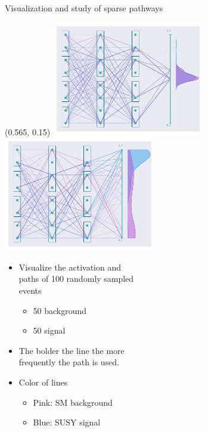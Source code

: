 \documentclass[UKenglish]{beamer}
\begin{document}
\begin{frame}{Visualization and study of sparse pathways}
    \begin{textblock}{0.8}(0.565, 0.15)
        \includegraphics[width = 0.5\textwidth]{figures/NetworkVis/BeforeTraining.pdf}
        \includegraphics[width = 0.5\textwidth]{figures/NetworkVis/AfterTraining.pdf}
    \end{textblock}
    \begin{itemize}
        \item Visualize the activation and \\
        paths of 100 randomly sampled \\
        events
        \begin{itemize}
            \item 50 background
            \item 50 signal
        \end{itemize}
        \item The bolder the line the more\\ 
        frequently the path is used.
        \item Color of lines 
        \begin{itemize}
            \item Pink: SM background
            \item Blue: SUSY signal
        \end{itemize}
    \end{itemize}
\end{frame}
\end{document}
